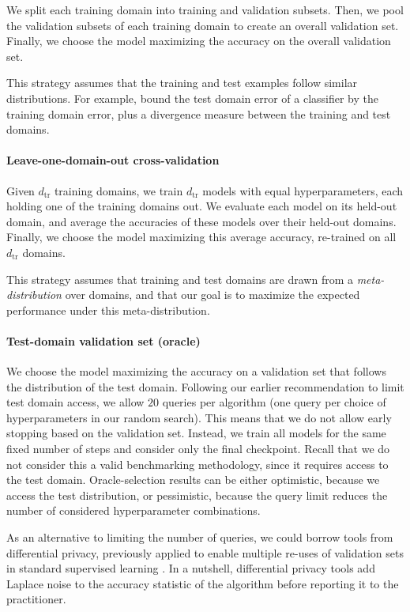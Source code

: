 \documentclass{article}
\newcommand{\dtr}{{d_\mathrm{tr}}}
\begin{document}
We split each training domain into training and validation subsets.
%
Then, we pool the validation subsets of each training domain to create an overall validation set.
%
Finally, we choose the model maximizing the accuracy on the overall validation set.

This strategy assumes that the training and test examples follow similar distributions.
%
For example, \citet{ben2010theory} bound the test domain error of a classifier by the training domain error, plus a divergence measure between the training and test domains.


\paragraph{Leave-one-domain-out cross-validation}

Given $\dtr$ training domains, we train $\dtr$ models with equal hyperparameters, each holding one of the training domains out.
%
We evaluate each model on its held-out domain, and average the accuracies of these models over their held-out domains.
%
Finally, we choose the model maximizing this average accuracy, re-trained on all $\dtr$ domains.

This strategy assumes that training and test domains are drawn from a \emph{meta-distribution} over domains, and that our goal is to maximize the expected performance under this meta-distribution.

\paragraph{Test-domain validation set (oracle)}

We choose the model maximizing the accuracy on a validation set that follows the distribution of the test domain.
%
Following our earlier recommendation to limit test domain access, we allow $20$ queries per algorithm (one query per choice of hyperparameters in our random search).
%
This means that we do not allow early stopping based on the validation set.
%
Instead, we train all models for the same fixed number of steps and consider only the final checkpoint.
%
Recall that we do not consider this a valid benchmarking methodology, since it requires access to the test domain.
%
Oracle-selection results can be either optimistic, because we access the test distribution, or pessimistic, because the query limit reduces the number of considered hyperparameter combinations.

As an alternative to limiting the number of queries, we could borrow tools from differential privacy, previously applied to enable multiple re-uses of validation sets in standard supervised learning \citep{dwork2015reusable}. 
%
In a nutshell, differential privacy tools add Laplace noise to the accuracy statistic of the algorithm before reporting it to the practitioner.
\end{document}
